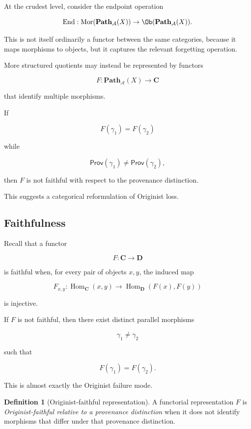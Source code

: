 \documentclass[
  11pt,
  a4paper,
  DIV=12,
  BCOR=0mm,
  parskip=half-
]{scrartcl}
\newcommand{\End}{\operatorname{End}}
\newcommand{\Hom}{\operatorname{Hom}}
\newcommand{\Mor}{\operatorname{Mor}}
\theoremstyle{definition}
\newtheorem{definition}{Definition}[section]
\theoremstyle{plain}
\theoremstyle{remark}
\begin{document}
At the crudest level, consider the endpoint operation

\[
  \End:
  \Mor(\mathbf{Path}_{\mathcal A}(X))
  \to
  \Ob(\mathbf{Path}_{\mathcal A}(X)).
\]

This is not itself ordinarily a functor between the same categories, because
it maps morphisms to objects, but it captures the relevant forgetting
operation.

More structured quotients may instead be represented by functors

\[
  F:
  \mathbf{Path}_{\mathcal A}(X)
  \to
  \mathbf C
\]

that identify multiple morphisms.

If

\[
  F(\gamma_1)=F(\gamma_2)
\]

while

\[
  \mathsf{Prov}(\gamma_1)
  \neq
  \mathsf{Prov}(\gamma_2),
\]

then \(F\) is not faithful with respect to the provenance distinction.

This suggests a categorical reformulation of Originist loss.


\subsection{Faithfulness}
\label{app:faithfulness}

Recall that a functor

\[
  F:\mathbf C\to\mathbf D
\]

is faithful when, for every pair of objects \(x,y\), the induced map

\[
  F_{x,y}:
  \Hom_{\mathbf C}(x,y)
  \to
  \Hom_{\mathbf D}(F(x),F(y))
\]

is injective.

If \(F\) is not faithful, then there exist distinct parallel morphisms

\[
  \gamma_1\neq\gamma_2
\]

such that

\[
  F(\gamma_1)=F(\gamma_2).
\]

This is almost exactly the Originist failure mode.

\begin{definition}[Originist-faithful representation]
\label{def:originist-faithful}
A functorial representation \(F\) is \emph{Originist-faithful relative to a
provenance distinction} when it does not identify morphisms that differ under
that provenance distinction.
\end{definition}
\end{document}
